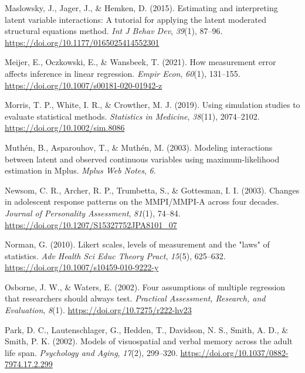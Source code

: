 \documentclass[
  11pt,
  man]{apa6}
\newlength{\cslhangindent}
\newlength{\cslentryspacingunit} %
\newenvironment{CSLReferences}[2] %
 {%
  \setlength{\parindent}{0pt}
  \ifodd #1
  \let\oldpar\par
  \def\par{\hangindent=\cslhangindent\oldpar}
  \fi
  \setlength{\parskip}{#2\cslentryspacingunit}
 }%
 {}
\begin{document}
\begin{CSLReferences}{1}{0}
\leavevmode{}%
Maslowsky, J., Jager, J., \& Hemken, D. (2015). Estimating and interpreting latent variable interactions: {A} tutorial for applying the latent moderated structural equations method. \emph{Int J Behav Dev}, \emph{39}(1), 87--96. \url{https://doi.org/10.1177/0165025414552301}

\leavevmode{}%
Meijer, E., Oczkowski, E., \& Wansbeek, T. (2021). How measurement error affects inference in linear regression. \emph{Empir Econ}, \emph{60}(1), 131--155. \url{https://doi.org/10.1007/s00181-020-01942-z}

\leavevmode{}%
Morris, T. P., White, I. R., \& Crowther, M. J. (2019). Using simulation studies to evaluate statistical methods. \emph{Statistics in Medicine}, \emph{38}(11), 2074--2102. \url{https://doi.org/10.1002/sim.8086}

\leavevmode{}%
Muthén, B., Asparouhov, T., \& Muthén, M. (2003). Modeling interactions between latent and observed continuous variables using maximum-likelihood estimation in {Mplus}. \emph{Mplus Web Notes}, \emph{6}.

\leavevmode{}%
Newsom, C. R., Archer, R. P., Trumbetta, S., \& Gottesman, I. I. (2003). Changes in adolescent response patterns on the {MMPI}/{MMPI-A} across four decades. \emph{Journal of Personality Assessment}, \emph{81}(1), 74--84. \url{https://doi.org/10.1207/S15327752JPA8101_07}

\leavevmode{}%
Norman, G. (2010). Likert scales, levels of measurement and the "laws" of statistics. \emph{Adv Health Sci Educ Theory Pract}, \emph{15}(5), 625--632. \url{https://doi.org/10.1007/s10459-010-9222-y}

\leavevmode{}%
Osborne, J. W., \& Waters, E. (2002). {Four assumptions of multiple regression that researchers should always test}. \emph{Practical Assessment, Research, and Evaluation}, \emph{8}(1). \url{https://doi.org/10.7275/r222-hv23}

\leavevmode{}%
Park, D. C., Lautenschlager, G., Hedden, T., Davidson, N. S., Smith, A. D., \& Smith, P. K. (2002). Models of visuospatial and verbal memory across the adult life span. \emph{Psychology and Aging}, \emph{17}(2), 299--320. \url{https://doi.org/10.1037/0882-7974.17.2.299}


\end{CSLReferences}
\end{document}
